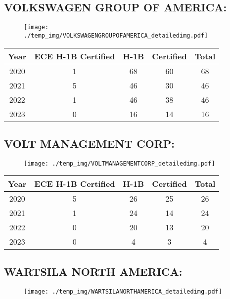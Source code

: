 \documentclass{article}%
\begin{document}
%
\newpage%
\subsection{VOLKSWAGEN GROUP OF AMERICA:}%
\label{subsec:VOLKSWAGENGROUPOFAMERICA}%
\label{VOLKSWAGENGROUPOFAMERICAdetailed}%


\begin{figure}[htbp]%
\centering%
\texttt{[image: ./temp\_img/VOLKSWAGENGROUPOFAMERICA\_detailedimg.pdf]}%
\end{figure}

%
\begin{longtable}{c|c|c|c|c}%
\hline%
Year&ECE H{-}1B Certified&H{-}1B&Certified&Total\\%
\hline%
2020&1&68&60&68\\%
\hline%
2021&5&46&30&46\\%
\hline%
2022&1&46&38&46\\%
\hline%
2023&0&16&14&16\\%
\hline%
\end{longtable}

%
\newpage%
\subsection{VOLT MANAGEMENT CORP:}%
\label{subsec:VOLTMANAGEMENTCORP}%
\label{VOLTMANAGEMENTCORPdetailed}%


\begin{figure}[htbp]%
\centering%
\texttt{[image: ./temp\_img/VOLTMANAGEMENTCORP\_detailedimg.pdf]}%
\end{figure}

%
\begin{longtable}{c|c|c|c|c}%
\hline%
Year&ECE H{-}1B Certified&H{-}1B&Certified&Total\\%
\hline%
2020&5&26&25&26\\%
\hline%
2021&1&24&14&24\\%
\hline%
2022&0&20&13&20\\%
\hline%
2023&0&4&3&4\\%
\hline%
\end{longtable}

%
\newpage%
\subsection{WARTSILA NORTH AMERICA:}%
\label{subsec:WARTSILANORTHAMERICA}%
\label{WARTSILANORTHAMERICAdetailed}%


\begin{figure}[htbp]%
\centering%
\texttt{[image: ./temp\_img/WARTSILANORTHAMERICA\_detailedimg.pdf]}%
\end{figure}
\end{document}
